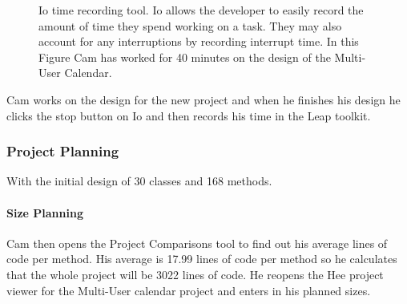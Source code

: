 \begin{figure}[p]
  \caption{Io time recording tool. Io allows the developer to easily record the 
  amount of time they spend working on a task.  They may also account for any
  interruptions by recording interrupt time. In this Figure Cam has worked for
  40 minutes on the design of the Multi-User Calendar.}
  \label{fig:io-start}
\end{figure}

Cam works on the design for the new project and when he finishes his design he
clicks the stop button on Io and then records his time in the Leap toolkit.

\subsubsection*{Project Planning}
With the initial design of 30 classes and 168 methods. 
\paragraph*{Size Planning}
Cam then opens the Project Comparisons tool to find out his average lines of
code per method. His average is 17.99 lines of code per method so he calculates
that the whole project will be 3022 lines of code.  He reopens the Hee project
viewer for the Multi-User calendar project and enters in his planned sizes.
